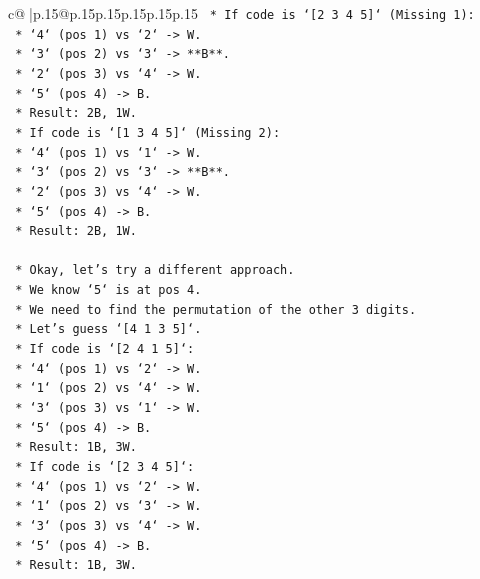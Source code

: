 \documentclass{article}
\begin{document}
{\begin{supertabular}{c@{$\;$}|p{.15\linewidth}@{}p{.15\linewidth}p{.15\linewidth}p{.15\linewidth}p{.15\linewidth}p{.15\linewidth}}
{{{\texttt{        *   If code is `{[}2 3 4 5{]}` (Missing 1):} \\
\texttt{            *   `4` (pos 1) vs `2` {-}> W.} \\
\texttt{            *   `3` (pos 2) vs `3` {-}> **B**.} \\
\texttt{            *   `2` (pos 3) vs `4` {-}> W.} \\
\texttt{            *   `5` (pos 4) {-}> B.} \\
\texttt{            *   Result: 2B, 1W.} \\
\texttt{        *   If code is `{[}1 3 4 5{]}` (Missing 2):} \\
\texttt{            *   `4` (pos 1) vs `1` {-}> W.} \\
\texttt{            *   `3` (pos 2) vs `3` {-}> **B**.} \\
\texttt{            *   `2` (pos 3) vs `4` {-}> W.} \\
\texttt{            *   `5` (pos 4) {-}> B.} \\
\texttt{            *   Result: 2B, 1W.} \\
\\ 
\texttt{    *   Okay, let's try a different approach.} \\
\texttt{    *   We know `5` is at pos 4.} \\
\texttt{    *   We need to find the permutation of the other 3 digits.} \\
\texttt{    *   Let's guess `{[}4 1 3 5{]}`.} \\
\texttt{        *   If code is `{[}2 4 1 5{]}`:} \\
\texttt{            *   `4` (pos 1) vs `2` {-}> W.} \\
\texttt{            *   `1` (pos 2) vs `4` {-}> W.} \\
\texttt{            *   `3` (pos 3) vs `1` {-}> W.} \\
\texttt{            *   `5` (pos 4) {-}> B.} \\
\texttt{            *   Result: 1B, 3W.} \\
\texttt{        *   If code is `{[}2 3 4 5{]}`:} \\
\texttt{            *   `4` (pos 1) vs `2` {-}> W.} \\
\texttt{            *   `1` (pos 2) vs `3` {-}> W.} \\
\texttt{            *   `3` (pos 3) vs `4` {-}> W.} \\
\texttt{            *   `5` (pos 4) {-}> B.} \\
\texttt{            *   Result: 1B, 3W.} \\
}}}
\end{supertabular}}
\end{document}
